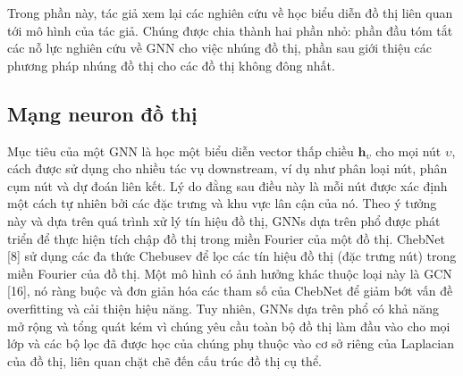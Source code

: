 Trong phần này, tác giả xem lại các nghiên cứu về học biểu diễn đồ thị liên quan tới mô hình của tác giả. Chúng được chia thành hai phần nhỏ: phần đầu tóm tắt các nỗ lực nghiên cứu về GNN cho việc nhúng đồ thị, phần sau giới thiệu các phương pháp nhúng đồ thị cho các đồ thị không đông nhất.

\subsection{Mạng neuron đồ thị}
Mục tiêu của một GNN là học một biểu diễn vector thấp chiều $\pmb{h}_{\upsilon}$ cho mọi nút $\upsilon$, cách được sử dụng cho nhiều tác vụ downstream, ví dụ như phân loại nút, phân cụm nút và dự đoán liên kết. Lý do đằng sau điều này là mỗi nút được xác định một cách tự nhiên bởi các đặc trưng và khu vực lân cận của nó. Theo ý tưởng này và dựa trên quá trình xử lý tín hiệu đồ thị, GNNs dựa trên phổ được phát triển để thực hiện tích chập đồ thị trong miền Fourier của một đồ thị. ChebNet [8] sử dụng các đa thức Chebusev để lọc các tín hiệu đồ thị (đặc trưng nút) trong miền Fourier của đồ thị. Một mô hình có ảnh hưởng khác thuộc loại này là GCN [16], nó ràng buộc và đơn giản hóa các tham số của ChebNet để giảm bớt vấn đề overfitting và cải thiện hiệu năng. Tuy nhiên, GNNs dựa trên phổ có khả năng mở rộng và tổng quát kém vì chúng yêu cầu toàn bộ đồ thị làm đầu vào cho mọi lớp và các bộ lọc đã được học của chúng phụ thuộc vào cơ sở riêng của Laplacian của đồ thị, liên quan chặt chẽ đến cấu trúc đồ thị cụ thể.